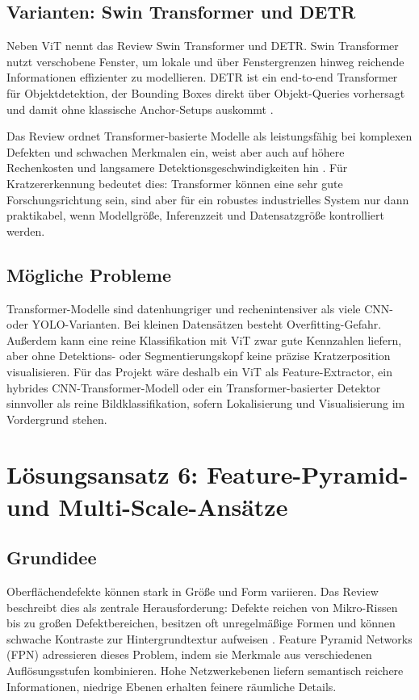 \documentclass[11pt,a4paper]{article}
\begin{document}
\subsection{Varianten: Swin Transformer und DETR}

Neben ViT nennt das Review Swin Transformer und DETR. Swin Transformer nutzt verschobene Fenster, um lokale und über Fenstergrenzen hinweg reichende Informationen effizienter zu modellieren. DETR ist ein end-to-end Transformer für Objektdetektion, der Bounding Boxes direkt über Objekt-Queries vorhersagt und damit ohne klassische Anchor-Setups auskommt \cite{applications_review}. 

Das Review ordnet Transformer-basierte Modelle als leistungsfähig bei komplexen Defekten und schwachen Merkmalen ein, weist aber auch auf höhere Rechenkosten und langsamere Detektionsgeschwindigkeiten hin \cite{applications_review}. Für Kratzererkennung bedeutet dies: Transformer können eine sehr gute Forschungsrichtung sein, sind aber für ein robustes industrielles System nur dann praktikabel, wenn Modellgröße, Inferenzzeit und Datensatzgröße kontrolliert werden.

\subsection{Mögliche Probleme}

Transformer-Modelle sind datenhungriger und rechenintensiver als viele CNN- oder YOLO-Varianten. Bei kleinen Datensätzen besteht Overfitting-Gefahr. Außerdem kann eine reine Klassifikation mit ViT zwar gute Kennzahlen liefern, aber ohne Detektions- oder Segmentierungskopf keine präzise Kratzerposition visualisieren. Für das Projekt wäre deshalb ein ViT als Feature-Extractor, ein hybrides CNN-Transformer-Modell oder ein Transformer-basierter Detektor sinnvoller als reine Bildklassifikation, sofern Lokalisierung und Visualisierung im Vordergrund stehen.

\section{Lösungsansatz 6: Feature-Pyramid- und Multi-Scale-Ansätze}

\subsection{Grundidee}

Oberflächendefekte können stark in Größe und Form variieren. Das Review beschreibt dies als zentrale Herausforderung: Defekte reichen von Mikro-Rissen bis zu großen Defektbereichen, besitzen oft unregelmäßige Formen und können schwache Kontraste zur Hintergrundtextur aufweisen \cite{applications_review}. Feature Pyramid Networks (FPN) adressieren dieses Problem, indem sie Merkmale aus verschiedenen Auflösungsstufen kombinieren. Hohe Netzwerkebenen liefern semantisch reichere Informationen, niedrige Ebenen erhalten feinere räumliche Details.
\end{document}
